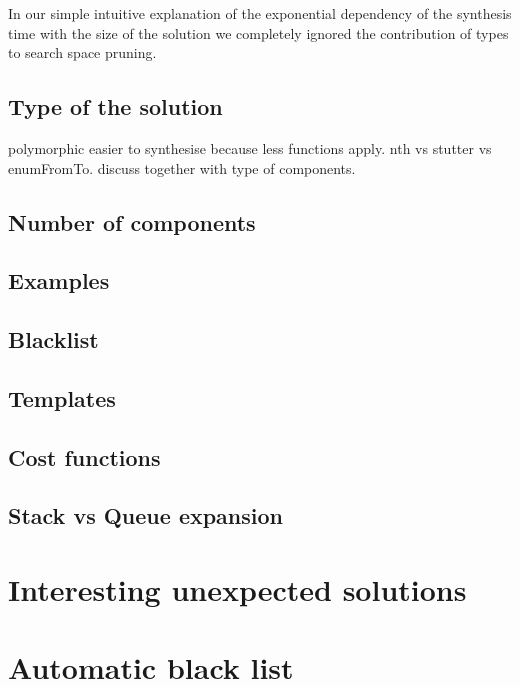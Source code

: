 In our simple intuitive explanation of the exponential dependency of the synthesis time with the size of the solution we completely ignored the contribution of types to search space pruning.


\subsection{Type of the solution}
polymorphic easier to synthesise because less functions apply. nth vs stutter vs enumFromTo.
discuss together with type of components.

\subsection{Number of components}
\subsection{Examples}
\subsection{Blacklist}
\subsection{Templates}
\subsection{Cost functions}
\subsection{Stack vs Queue expansion}

\section{Interesting unexpected solutions}
\section{Automatic black list}\label{Automatic black list}

